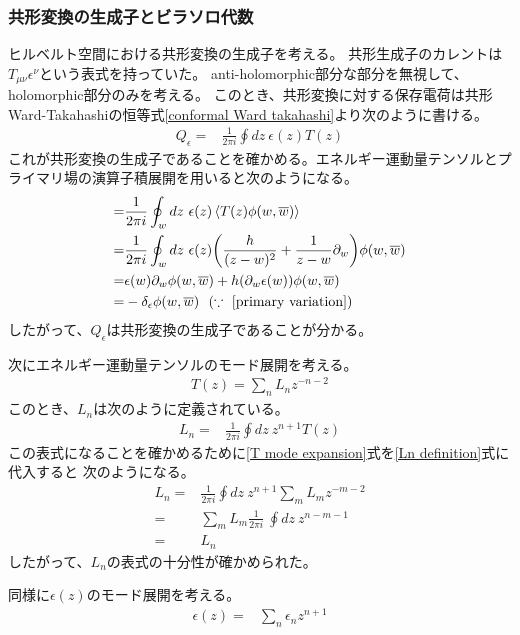 \documentclass[11pt, dvipdfmx]{article}
\numberwithin{equation}{section}
\newcommand{\blankline}{\par\vspace{\baselineskip}} %
\begin{document}
\subsubsection{共形変換の生成子とビラソロ代数}
ヒルベルト空間における共形変換の生成子を考える。
共形生成子のカレントは$T_{\mu\nu}\epsilon^{\nu}$という表式を持っていた。
anti-holomorphic部分な部分を無視して、holomorphic部分のみを考える。
このとき、共形変換に対する保存電荷は共形Ward-Takahashiの恒等式\eqref{conformal Ward takahashi}より次のように書ける。
\begin{align}
    Q_{\epsilon}=&\frac{1}{2\pi i}\oint dz \ \epsilon(z) T(z)
\end{align}
これが共形変換の生成子であることを確かめる。エネルギー運動量テンソルとプライマリ場の演算子積展開を用いると次のようになる。
\begin{align}
    [Q_{\epsilon},\phi(w,\overline{w})]=&\frac{1}{2\pi i}\oint_{w} dz \ \epsilon(z) \ev{T(z)\phi(w,\overline{w})}\notag\\
    =&\frac{1}{2\pi i}\oint_{w} dz \ \epsilon(z) \qty(\frac{h}{(z-w)^2}+\frac{1}{z-w}\partial_w)\phi(w,\overline{w})\notag\\
    =&\epsilon(w)\partial_w \phi(w,\overline{w})+h(\partial_w \epsilon(w))\phi(w,\overline{w})\notag\\
    =&-\delta_{\epsilon}\phi(w,\overline{w})\ \ (\because\ \eqref{primary variation})
\end{align}
したがって、$Q_{\epsilon}$は共形変換の生成子であることが分かる。
\blankline
次にエネルギー運動量テンソルのモード展開を考える。
\begin{align}
    T(z)=\sum_{n}L_n z^{-n-2}\label{T mode expansion}
\end{align}
このとき、$L_n$は次のように定義されている。
\begin{align}
    L_n=&\frac{1}{2\pi i}\oint dz \ z^{n+1} T(z)\label{Ln definition}
\end{align}
この表式になることを確かめるために\eqref{T mode expansion}式を\eqref{Ln definition}式に代入すると
次のようになる。
\begin{align}
      L_n=&\frac{1}{2\pi i}\oint dz \ z^{n+1} \sum_{m}L_m z^{-m-2}\\
      =&\sum_{m}L_m \frac{1}{2\pi i}\
    \oint dz \ z^{n - m -1}\\
        =&L_n
\end{align}
したがって、$L_n$の表式の十分性が確かめられた。
\blankline
同様に$\epsilon(z)$のモード展開を考える。
\begin{align}
    \epsilon(z)=&\sum_{n}\epsilon_n z^{n+1}
\end{align}
\end{document}
